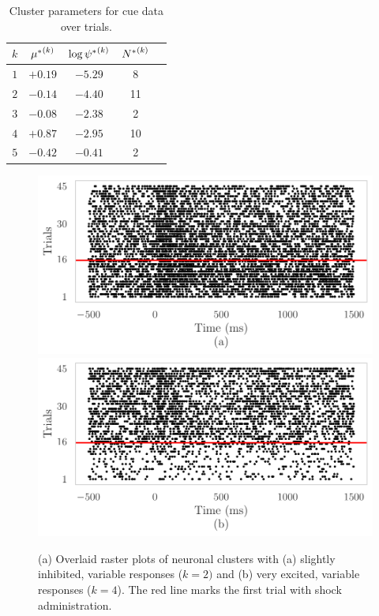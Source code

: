 \documentclass[twoside]{article}
\begin{document}
\begin{table}[h]
\vspace{-3mm}
\caption{Cluster parameters for cue data over trials.} \label{shock-table}
\begin{center}
\begin{tabular}{c|cccl}
$k$ & ${\mu^*}^{(k)}_{}$ & $\log {\psi^*}^{(k)}_{}$ &${N^*}^{(k)}_{}$ \\
\hline
$1$ & $+0.19$ & $-5.29$ & 8  \\
$2$ &$-0.14$ & $-4.40$ & 11 \\
$3$ &$-0.08$ & $-2.38$  & 2 \\
$4$ &$+0.87$ & $-2.95$ & 10 \\
$5$ &$-0.42$ & $-0.41$ & 2 
\end{tabular}
\vspace{-4mm}
\end{center}
\end{table} 

\begin{figure}[h]
\begin{center}
\includegraphics[scale=0.5]{../img/shock-mod-cue-raster-a.pdf}
\includegraphics[scale=0.5]{../img/shock-mod-cue-raster-b.pdf}
\end{center}
\caption{(a) Overlaid raster plots of neuronal clusters with (a) slightly inhibited, variable responses ($k = 2)$ and (b) very excited, variable responses ($k = 4$). The red line marks the first trial with shock administration.} \label{shock-rasters}
\end{figure}
\end{document}
